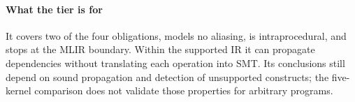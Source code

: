 \paragraph{What the tier is for} It covers two of the four obligations, models no aliasing, is intraprocedural, and stops at the MLIR boundary.
Within the supported IR it can propagate dependencies without translating each operation into SMT.
Its conclusions still depend on sound propagation and detection of unsupported constructs; the five-kernel comparison does not validate those properties for arbitrary programs.
